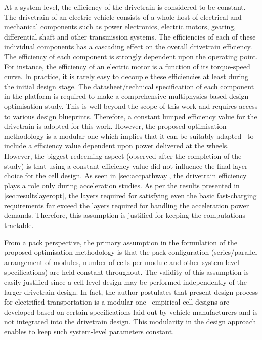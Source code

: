 At  a  system level,  the  efficiency  of the  drivetrain  is  considered to  be
constant. The  drivetrain of  an electric  vehicle consists of  a whole  host of
electrical and mechanical components such as power electronics, electric motors,
gearing, differential shaft and other  transmission systems. The efficiencies of
each  of these  individual  components has  a cascading  effect  on the  overall
drivetrain efficiency.  The efficiency of  each component is  strongly dependent
upon the operating point. For instance, the efficiency of an electric motor is a
function  of  its  torque-speed  curve.  In  practice,  it  is  rarely  easy  to
decouple  these efficiencies  at  least  during the  initial  design stage.  The
datasheet/technical specification of each component  in the platform is required
to make  a comprehensive multiphysics-based  design optimisation study.  This is
well  beyond the  scope  of this  work  and requires  access  to various  design
blueprints. Therefore, a constant lumped  efficiency value for the drivetrain is
adopted  for this  work. However,  the  proposed optimisation  methodology is  a
modular one  which implies that  it can be suitably  adapted \eg~to  include a
efficiency  value dependent  upon power  delivered at  the wheels.  However, the
biggest redeeming  aspect (observed after the  completion of the study)  is that
using a constant  efficiency value did not influence the  final layer choice for
the cell  design. As  seen in  \cref{sec:accpathway}, the  drivetrain efficiency
plays a role  only during acceleration studies. As per  the results presented in
\cref{sec:resultslayeropt}, the  layers required  for satisfying even  the basic
fast-charging  requirements far  exceed  the layers  required  for handling  the
acceleration power demands. Therefore, this  assumption is justified for keeping
the computations tractable.

From  a  pack  perspective,  the   primary  assumption  in  the  formulation  of
the   proposed  optimisation   methodology  is   that  the   pack  configuration
(series/parallel arrangement  of modules, number  of cells per module  and other
system-level specifications) are held constant  throughout. The validity of this
assumption  is easily  justified  since  a cell-level  design  may be  performed
independently of  the larger drivetrain  design. In fact, the  author postulates
that  present design  process for  electrified transportation  is a  modular one
\ie~empirical cell designs are  developed based on certain specifications laid
out by vehicle  manufacturers and is not integrated into  the drivetrain design.
This  modularity  in the  design  approach  enables  to keep  such  system-level
parameters constant.

